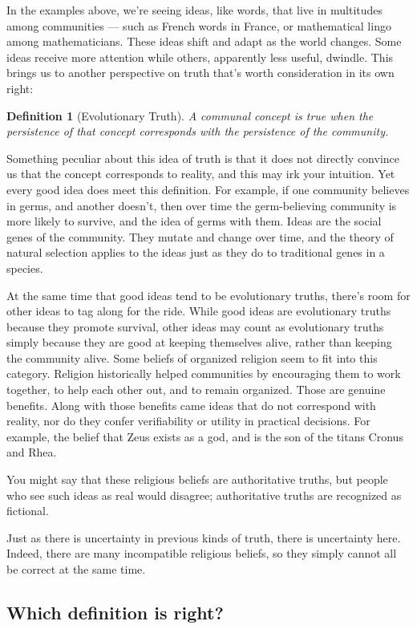 \documentclass[11pt, oneside]{article}   	%
\newtheorem{defn}{Definition}
\begin{document}
In the examples above, we're seeing ideas, like words, that live in multitudes
among communities --- such as French words in France, or mathematical lingo
among mathematicians. These ideas shift and adapt as the world changes.
Some ideas receive more attention while others, apparently less useful, dwindle.
This brings us to another perspective on truth that's worth
consideration in its own right:
\begin{defn}[Evolutionary Truth]
    A communal concept is true when the persistence of that concept corresponds
    with the persistence of the community.
\end{defn}

Something peculiar about this idea of truth is that it does not directly
convince us that the concept corresponds to reality, and this may irk your
intuition. Yet every good idea does meet this definition.
For example, if one community believes in germs, and another
doesn't, then over time the germ-believing community is more likely to survive,
and the idea of germs with them.
Ideas are the social genes of the community.
They mutate and change over time, and the theory of natural selection
applies to the ideas just as they do to traditional genes in a species.

At the same time that good ideas tend to be evolutionary truths, there's room
for other ideas to tag along for the ride.
While good ideas are evolutionary truths because they promote survival, other
ideas may count as evolutionary truths simply because they are good at
keeping themselves alive, rather than keeping the community alive.
Some beliefs of organized religion seem to fit into this category.
Religion historically helped communities
by encouraging them to work together, to help each other
out, and to remain organized. Those are genuine benefits. Along with those
benefits came ideas that do not correspond with reality, nor do they confer
verifiability or utility in practical decisions. For example, the belief that
Zeus exists as a god, and is the son of the titans Cronus and Rhea.

You might say that these religious beliefs are authoritative truths, but people
who see such ideas as real would disagree; authoritative truths are recognized
as fictional.

Just as there is uncertainty in previous kinds of truth, there is uncertainty
here. Indeed, there are many incompatible religious beliefs, so they simply
cannot all be correct at the same time.

\subsection{Which definition is right?}
\end{document}
